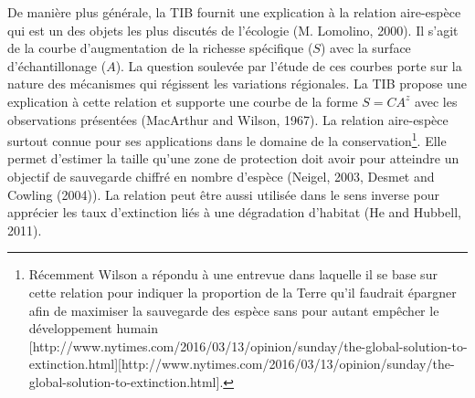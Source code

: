 De manière plus générale, la TIB fournit une explication à la relation
aire-espèce qui est un des objets les plus discutés de l'écologie (M.
Lomolino, 2000). Il s'agit de la courbe d'augmentation de la richesse
spécifique (\(S\)) avec la surface d'échantillonage (\(A\)). La question
soulevée par l'étude de ces courbes porte sur la nature des mécanismes
qui régissent les variations régionales. La TIB propose une explication
à cette relation et supporte une courbe de la forme \(S=CA^z\) avec les
observations présentées (MacArthur and Wilson, 1967). La relation
aire-espèce surtout connue pour ses applications dans le domaine de la
conservation\footnote{Récemment Wilson a répondu à une entrevue dans
  laquelle il se base sur cette relation pour indiquer la proportion de
  la Terre qu'il faudrait épargner afin de maximiser la sauvegarde des
  espèce sans pour autant empêcher le développement humain
  {[}http://www.nytimes.com/2016/03/13/opinion/sunday/the-global-solution-to-extinction.html{]}{[}http://www.nytimes.com/2016/03/13/opinion/sunday/the-global-solution-to-extinction.html{]}.}.
Elle permet d'estimer la taille qu'une zone de protection doit avoir
pour atteindre un objectif de sauvegarde chiffré en nombre d'espèce
(Neigel, 2003, Desmet and Cowling (2004)). La relation peut être aussi
utilisée dans le sens inverse pour apprécier les taux d'extinction liés
à une dégradation d'habitat (He and Hubbell, 2011).

